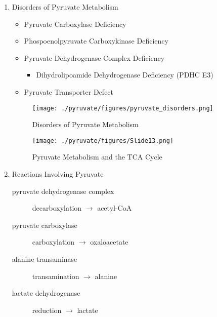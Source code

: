 \documentclass{scrartcl}
\begin{document}
\begin{enumerate}
\item Disorders of Pyruvate Metabolism
\label{sec:org4f925a4}
\begin{itemize}
\item Pyruvate Carboxylase Deficiency
\item Phospoenolpyruvate Carboxykinase Deficiency
\item Pyruvate Dehydrogenase Complex Deficiency
\begin{itemize}
\item Dihydrolipoamide Dehydrogenase Deficiency (PDHC E3)
\end{itemize}
\item Pyruvate Transporter Defect
\end{itemize}

\begin{figure}[htbp]
\centering
\texttt{[image: ./pyruvate/figures/pyruvate\_disorders.png]}
\caption[TCA]{\label{fig:org23b9949}
Disorders of Pyruvate Metabolism}
\end{figure}


\begin{figure}[htbp]
\centering
\texttt{[image: ./pyruvate/figures/Slide13.png]}
\caption[TCA]{\label{fig:org6b27a40}
Pyruvate Metabolism and the TCA Cycle}
\end{figure}

\item Reactions Involving Pyruvate
\label{sec:org5c85f8d}

\begin{description}
\item[{pyruvate dehydrogenase complex}] decarboxylation \(\to\) acetyl-CoA
\end{description}


\begin{description}
\item[{pyruvate carboxylase}] carboxylation \(\to\) oxaloacetate
\end{description}


\begin{description}
\item[{alanine transaminase}] transamination \(\to\) alanine
\end{description}


\begin{description}
\item[{lactate dehydrogenase}] reduction \(\to\) lactate
\end{description}

\end{enumerate}
\end{document}
